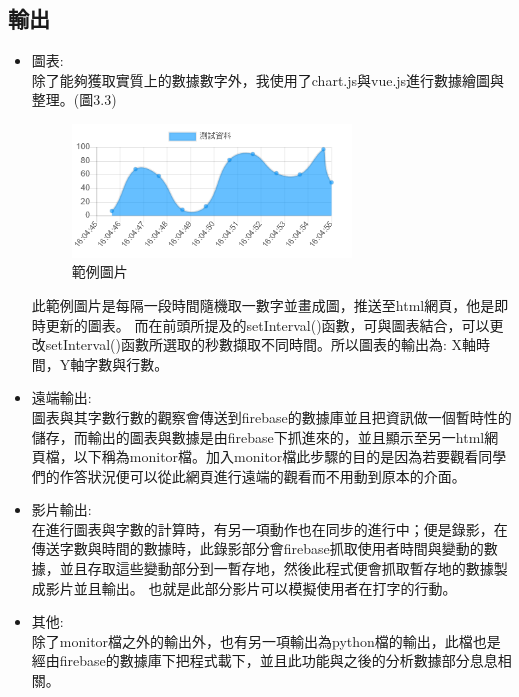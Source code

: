 \subsection{輸出}
\begin{itemize}
	\item 圖表:\\
	除了能夠獲取實質上的數據數字外，我使用了chart.js與vue.js進行數據繪圖與整理。\cite{name21}(圖3.3)
	\begin{figure}[H] %
		\centering %
		\includegraphics[width=0.7\textwidth]{3.png} %
		\caption{範例圖片} %
		\label{Fig.3.3} %
	\end{figure}
此範例圖片是每隔一段時間隨機取一數字並畫成圖，推送至html網頁，他是即時更新的圖表。
而在前頭所提及的setInterval()函數，可與圖表結合，可以更改setInterval()函數所選取的秒數擷取不同時間。所以圖表的輸出為: X軸時間，Y軸字數與行數。\\
	\item 遠端輸出:\\
	圖表與其字數行數的觀察會傳送到firebase的數據庫並且把資訊做一個暫時性的儲存，而輸出的圖表與數據是由firebase下抓進來的，並且顯示至另一html網頁檔，以下稱為monitor檔。加入monitor檔此步驟的目的是因為若要觀看同學們的作答狀況便可以從此網頁進行遠端的觀看而不用動到原本的介面。
	\item 影片輸出:\\
	在進行圖表與字數的計算時，有另一項動作也在同步的進行中；便是錄影，在傳送字數與時間的數據時，此錄影部分會firebase抓取使用者時間與變動的數據，並且存取這些變動部分到一暫存地，然後此程式便會抓取暫存地的數據製成影片並且輸出。
	也就是此部分影片可以模擬使用者在打字的行動。
 	\item 其他:\\
 	除了monitor檔之外的輸出外，也有另一項輸出為python檔的輸出，此檔也是經由firebase的數據庫下把程式載下，並且此功能與之後的分析數據部分息息相關。
\end{itemize}
